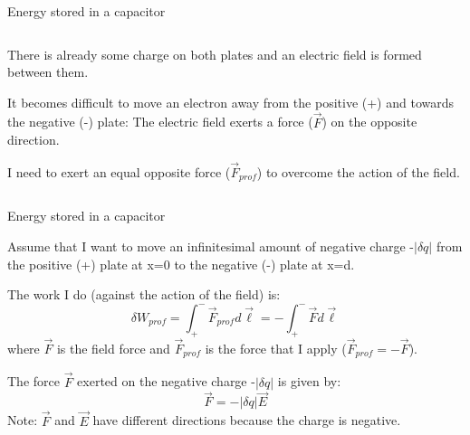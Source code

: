\begin{frame}{Energy stored in a capacitor}
\begin{columns}
\begin{column}{0.65\textwidth}
{      \begin{itemize}
      {\small
         \item There is already some charge on both plates and an electric field is formed between them.
         \item It becomes difficult to move an electron away from the positive (+) and towards the negative (-) plate:
               The electric field exerts a force ($\vec{F}$) on the opposite direction.
         \item I need to exert an equal opposite force ($\vec{F}_{prof}$) to overcome the action of the field.
      }
      \end{itemize}
  }
  \end{column}
\end{columns}

\end{frame}


%
%
%

\begin{frame}{Energy stored in a capacitor}

Assume that I want to move an infinitesimal amount of negative charge -$|{\delta}q|$
from the positive (+) plate at x=0 to the negative (-) plate at x=d.\\

\vspace{0.2cm}

The work I do (against the action of the field) is:
\begin{equation*}
  {\delta}W_{prof} = \int_{+}^{-} \vec{F}_{prof} d\vec{\ell} = - \int_{+}^{-} \vec{F} d\vec{\ell}
\end{equation*}
where $\vec{F}$ is the field force and $\vec{F}_{prof}$ is the force that I apply ($\vec{F}_{prof} = - \vec{F}$).\\

\vspace{0.2cm}

The force $\vec{F}$ exerted on the negative charge -$|{\delta}q|$ is given by:
\begin{equation*}
  \vec{F} = -|{\delta}q| \vec{E}
\end{equation*}
Note: $\vec{F}$ and $\vec{E}$ have different directions because the charge is negative.

\end{frame}

%
%
%

